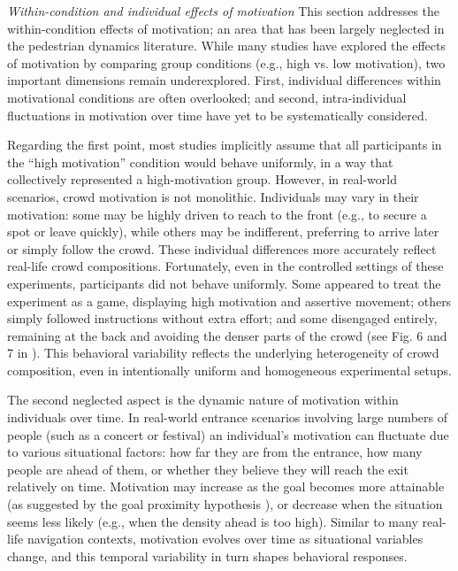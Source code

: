 \documentclass[pdflatex,sn-mathphys-num]{sn-jnl}%
\theoremstyle{thmstyleone}%
\theoremstyle{thmstyletwo}%
\theoremstyle{thmstylethree}%
\begin{document}




\textit{Within-condition and individual effects of motivation}
This section addresses the within-condition effects of motivation; an area that has been largely neglected in the pedestrian dynamics literature. While many studies have explored the effects of motivation by comparing group conditions (e.g., high vs. low motivation), two important dimensions remain underexplored. First, individual differences within motivational conditions are often overlooked; and second, intra-individual fluctuations in motivation over time have yet to be systematically considered.

Regarding the first point, most studies implicitly assume that all participants in the “high motivation” condition would behave uniformly, in a way that collectively represented a high-motivation group. However, in real-world scenarios, crowd motivation is not monolithic. Individuals may vary in their motivation: some may be highly driven to reach to the front (e.g., to secure a spot or leave quickly), while others may be indifferent, preferring to arrive later or simply follow the crowd. These individual differences more accurately reflect real-life crowd compositions. Fortunately, even in the controlled settings of these experiments, participants did not behave uniformly. Some appeared to treat the experiment as a game, displaying high motivation and assertive movement; others simply followed instructions without extra effort; and some disengaged entirely, remaining at the back and avoiding the denser parts of the crowd (see Fig. 6 and 7 in \cite{adrian_crowds_2020}). This behavioral variability reflects the underlying heterogeneity of crowd composition, even in intentionally uniform and homogeneous experimental setups. 

The second neglected aspect is the dynamic nature of motivation within individuals over time. In real-world entrance scenarios involving large numbers of people (such as a concert or festival) an individual’s motivation can fluctuate due to various situational factors: how far they are from the entrance, how many people are ahead of them, or whether they believe they will reach the exit  relatively on time. Motivation may increase as the goal becomes more attainable (as suggested by the goal proximity hypothesis \cite{jhang_impatience_2015}), or decrease when the situation seems less likely (e.g., when the density ahead is too high). Similar to many real-life navigation contexts, motivation evolves over time as situational variables change, and this temporal variability in turn shapes behavioral responses.
\end{document}
